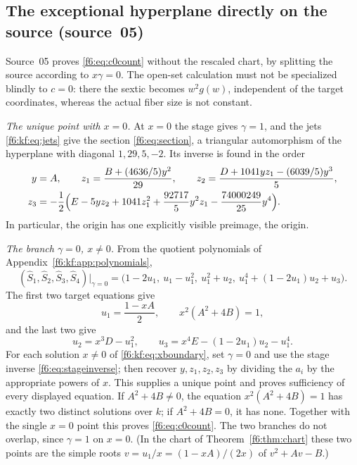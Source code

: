 \documentclass[11pt,a4paper]{article}
\theoremstyle{definition}
\newcommand{\src}[1]{\textup{(source~#1)}}
\begin{document}
\subsection{The exceptional hyperplane directly on the source \src{05}}
\label{f6:kf:sec:hyperplane}
Source~05 proves \eqref{f6:eq:c0count} without the rescaled chart, by
splitting the source according to $x\gamma=0$. The open-set calculation must
not be specialized blindly to $c=0$: there the sextic becomes
$w^2g(w)$, independent of the target coordinates, whereas the actual fiber
size is not constant.

\emph{The unique point with $x=0$.} At $x=0$ the stage gives $\gamma=1$, and
the jets \eqref{f6:kf:eq:jets} give the section \eqref{f6:eq:section}, a
triangular automorphism of the hyperplane with diagonal $1,29,5,-2$. Its
inverse is found in the order
\begin{align*}
y&=A,\qquad z_1=\frac{B+(4636/5)y^2}{29},\qquad
z_2=\frac{D+1041yz_1-(6039/5)y^3}{5},\\
z_3&=-\frac12\Bigl(E-5yz_2+1041z_1^2+\frac{92717}{5}y^2z_1
     -\frac{74000249}{25}y^4\Bigr).
\end{align*}
In particular, the origin has one explicitly visible preimage, the origin.

\emph{The branch $\gamma=0$, $x\ne0$.} From the quotient polynomials of
Appendix~\ref{f6:kf:app:polynomials},
\begin{equation}\label{f6:kf:eq:Egamma0}
(\widehat S_1,\widehat S_2,\widehat S_3,\widehat S_4)|_{\gamma=0}
=\bigl(1-2u_1,\ u_1-u_1^2,\ u_1^2+u_2,\ u_1^4+(1-2u_1)u_2+u_3\bigr).
\end{equation}
The first two target equations give
\begin{equation}\label{f6:kf:eq:xboundary}
u_1=\frac{1-xA}{2},\qquad x^2(A^2+4B)=1,
\end{equation}
and the last two give
\begin{equation}\label{f6:kf:eq:u23boundary}
u_2=x^3D-u_1^2,\qquad u_3=x^4E-(1-2u_1)u_2-u_1^4.
\end{equation}
For each solution $x\ne0$ of \eqref{f6:kf:eq:xboundary}, set $\gamma=0$ and
use the stage inverse \eqref{f6:eq:stageinverse}; then recover
$y,z_1,z_2,z_3$ by dividing the $a_i$ by the appropriate powers of $x$. This
supplies a unique point and proves sufficiency of every displayed equation.
If $A^2+4B\ne0$, the equation $x^2(A^2+4B)=1$ has exactly two distinct
solutions over $k$; if $A^2+4B=0$, it has none. Together with the single
$x=0$ point this proves \eqref{f6:eq:c0count}. The two branches do not
overlap, since $\gamma=1$ on $x=0$. (In the chart of
Theorem~\ref{f6:thm:chart} these two points are the simple roots $v=u_1/x=(1-xA)/(2x)$ of
$v^2+Av-B$.)
\end{document}
